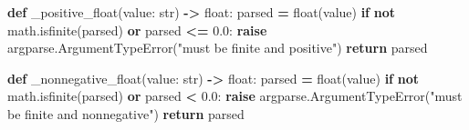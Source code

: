 \documentclass[
  american,
  11pt,
  letterpaper,
]{article}
\newenvironment{Shaded}{\begin{snugshade}}{\end{snugshade}}
\newcommand{\BuiltInTok}[1]{#1}
\newcommand{\ControlFlowTok}[1]{\textcolor[rgb]{0.13,0.29,0.53}{\textbf{#1}}}
\newcommand{\FloatTok}[1]{\textcolor[rgb]{0.00,0.00,0.81}{#1}}
\newcommand{\KeywordTok}[1]{\textcolor[rgb]{0.13,0.29,0.53}{\textbf{#1}}}
\newcommand{\NormalTok}[1]{#1}
\newcommand{\OperatorTok}[1]{\textcolor[rgb]{0.81,0.36,0.00}{\textbf{#1}}}
\newcommand{\StringTok}[1]{\textcolor[rgb]{0.31,0.60,0.02}{#1}}
\renewenvironment{Shaded}{\par\smallskip}{\par\smallskip}
\begin{document}
\begin{Shaded}
\begin{Highlighting}[]
\KeywordTok{def}\NormalTok{ \_positive\_float(value: }\BuiltInTok{str}\NormalTok{) }\OperatorTok{{-}\textgreater{}} \BuiltInTok{float}\NormalTok{:}
\NormalTok{    parsed }\OperatorTok{=} \BuiltInTok{float}\NormalTok{(value)}
    \ControlFlowTok{if} \KeywordTok{not}\NormalTok{ math.isfinite(parsed) }\KeywordTok{or}\NormalTok{ parsed }\OperatorTok{\textless{}=} \FloatTok{0.0}\NormalTok{:}
        \ControlFlowTok{raise}\NormalTok{ argparse.ArgumentTypeError(}\StringTok{"must be finite and positive"}\NormalTok{)}
    \ControlFlowTok{return}\NormalTok{ parsed}


\KeywordTok{def}\NormalTok{ \_nonnegative\_float(value: }\BuiltInTok{str}\NormalTok{) }\OperatorTok{{-}\textgreater{}} \BuiltInTok{float}\NormalTok{:}
\NormalTok{    parsed }\OperatorTok{=} \BuiltInTok{float}\NormalTok{(value)}
    \ControlFlowTok{if} \KeywordTok{not}\NormalTok{ math.isfinite(parsed) }\KeywordTok{or}\NormalTok{ parsed }\OperatorTok{\textless{}} \FloatTok{0.0}\NormalTok{:}
        \ControlFlowTok{raise}\NormalTok{ argparse.ArgumentTypeError(}\StringTok{"must be finite and nonnegative"}\NormalTok{)}
    \ControlFlowTok{return}\NormalTok{ parsed}



\end{Highlighting}
\end{Shaded}
\end{document}
